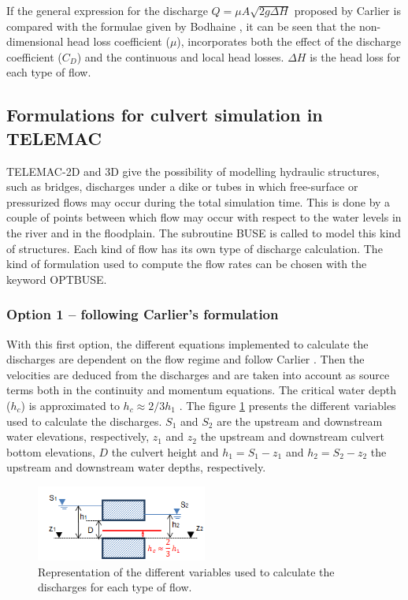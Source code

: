 If the general expression for the discharge $Q=\mu A \sqrt{2g\Delta H}$ proposed by
Carlier \cite{Carlier1972} is compared with the formulae given by Bodhaine \cite{Bodhaine1968},
it can be seen that the non-dimensional head loss coefficient ($\mu$),
incorporates both the effect of the discharge coefficient ($C_D$) and the continuous
and local head losses. $\Delta H$ is the head loss for each type of flow.

\subsection{Formulations for culvert simulation in TELEMAC}

TELEMAC-2D and 3D give the possibility of modelling hydraulic structures, such as bridges,
discharges under a dike or tubes in which free-surface or pressurized flows may
occur during the total simulation time.
This is done by a couple of points between which flow may occur with respect to
the water levels in the river and in the floodplain.
The subroutine BUSE is called to model this kind of structures.
Each kind of flow has its own type of discharge calculation.
The kind of formulation used to compute the flow rates can be chosen with the keyword OPTBUSE.

\subsubsection{Option 1 -- following Carlier's formulation}

With this first option, the different equations implemented to calculate the
discharges are dependent on the flow regime and follow Carlier \cite{Carlier1972}.
Then the velocities are deduced from the discharges and are taken into account as source
terms both in the continuity and momentum equations.
The critical water depth ($h_c$) is approximated to $h_c \approx 2/3 h_1$ \cite{Carlier1972}.
The figure \ref{fig:culvert_fig5} presents the different variables used to calculate the discharges.
$S_1$ and $S_2$ are the upstream and downstream water elevations, respectively, $z_1$ and $z_2$
the upstream and downstream culvert bottom elevations, $D$ the culvert height and $h_1=S_1-z_1$
and $h_2=S_2-z_2$ the upstream and downstream water depths, respectively.

\begin{figure}[H]
\begin{center}
  \includegraphics[width=0.5\textwidth]{graphics/culvert_fig5.png}
\end{center}
\caption{Representation of the different variables used to calculate
the discharges for each type of flow.}
\label{fig:culvert_fig5}
\end{figure}

